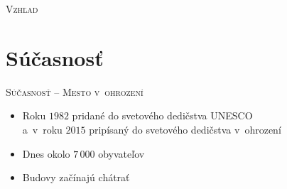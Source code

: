 \documentclass[xcolor=dvipsnames]{beamer}
\begin{document}
\begin{frame}{\textsc{Vzhľad}}
\begin{figure}[ht]
\begin{center}
		\end{center}
	\end{figure}
\end{frame}

\section{Súčasnosť}
\begin{frame}{\textsc{Súčasnosť -- Mesto v~ohrození}}
\transwipe
	\begin{itemize}
	\item Roku $1982$ pridané do svetového dedičstva \textsc{UNESCO}\\
		a~v~roku $2015$ pripísaný do svetového dedičstva v~ohrození
	\item Dnes okolo $7\,000$ obyvateľov
	\item Budovy začínajú chátrať
	\end{itemize}
	\begin{figure}[ht]
		\begin{center}
		\end{center}
	\end{figure}
\end{frame}

\end{document}
